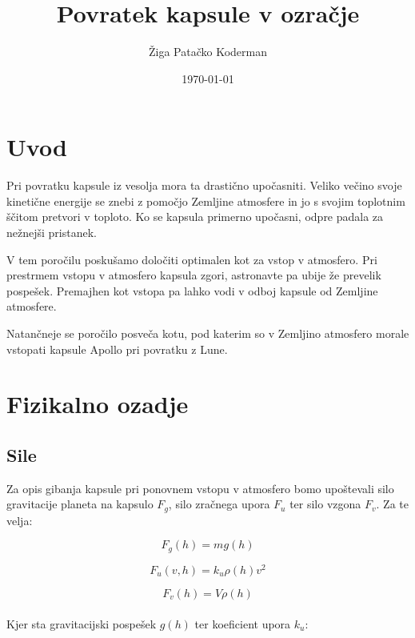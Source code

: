 \documentclass[11pt,a4paper]{article}
\begin{document}
\title{Povratek kapsule v ozra\v cje}
\author{\v Ziga Pata\v cko Koderman}
\date{\today}

\clearpage\maketitle
\thispagestyle{empty}
\pagebreak

\tableofcontents
\pagebreak

\section{Uvod}

Pri povratku kapsule iz vesolja mora ta drasti\v cno upo\v casniti. Veliko ve\v cino svoje kineti\v cne energije se znebi z pomo\v cjo Zemljine atmosfere in jo s svojim toplotnim \v s\v citom pretvori v toploto. Ko se kapsula primerno upo\v casni, odpre padala za ne\v znej\v si pristanek.

V tem poro\v cilu posku\v samo dolo\v citi optimalen kot za vstop v atmosfero. Pri prestrmem vstopu v atmosfero kapsula zgori, astronavte pa ubije \v ze prevelik pospe\v sek. Premajhen kot vstopa pa lahko vodi v odboj kapsule od Zemljine atmosfere.

Natan\v cneje se poro\v cilo posve\v ca kotu, pod katerim so v Zemljino atmosfero morale vstopati kapsule Apollo pri povratku z Lune.

\pagebreak

\section{Fizikalno ozadje}
\subsection{Sile}

Za opis gibanja kapsule pri ponovnem vstopu v atmosfero bomo upo\v stevali silo gravitacije planeta na kapsulo $F_g$, silo zra\v cnega upora $F_u$ ter silo vzgona $F_v$. Za te velja:


\begin{equation}
F_g(h) = m g(h)
\end{equation}

\begin{equation}
F_u(v, h) = k_{u}\rho (h) v^2
\end{equation}

\begin{equation}
F_v(h) = V \rho(h)
\end{equation} \\
Kjer sta gravitacijski pospe\v sek $g(h)$ ter koeficient upora $k_u$:
\end{document}
